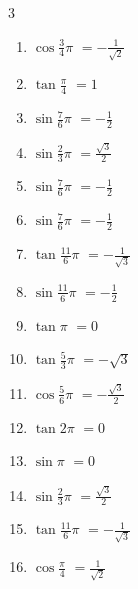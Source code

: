 \begin{multicols}{3}
\begin{enumerate}
  \item $\displaystyle \cos{\frac{3}{4}\pi}$
        $\displaystyle =-\frac{1}{\sqrt{2}}$

  \item $\displaystyle \tan{\frac{\pi}{4}}$
        $\displaystyle =1$

  \item $\displaystyle \sin{\frac{7}{6}\pi}$
        $\displaystyle =-\frac{1}{2}$

  \item $\displaystyle \sin{\frac{2}{3}\pi}$
        $\displaystyle =\frac{\sqrt{3}}{2}$

  \item $\displaystyle \sin{\frac{7}{6}\pi}$
        $\displaystyle =-\frac{1}{2}$

  \item $\displaystyle \sin{\frac{7}{6}\pi}$
        $\displaystyle =-\frac{1}{2}$

  \item $\displaystyle \tan{\frac{11}{6}\pi}$
        $\displaystyle =-\frac{1}{\sqrt{3}}$

\columnbreak %

\resetques

  \item $\displaystyle \sin{\frac{11}{6}\pi}$
        $\displaystyle =-\frac{1}{2}$

  \item $\displaystyle \tan{\pi}$
        $\displaystyle =0$

  \item $\displaystyle \tan{\frac{5}{3}\pi}$
        $\displaystyle =-\sqrt{3}$

  \item $\displaystyle \cos{\frac{5}{6}\pi}$
        $\displaystyle =-\frac{\sqrt{3}}{2}$

  \item $\displaystyle \tan{2\pi}$
        $\displaystyle =0$

  \item $\displaystyle \sin{\pi}$
        $\displaystyle =0$

  \item $\displaystyle \sin{\frac{2}{3}\pi}$
        $\displaystyle =\frac{\sqrt{3}}{2}$

  \item $\displaystyle \tan{\frac{11}{6}\pi}$
        $\displaystyle =-\frac{1}{\sqrt{3}}$

  \item $\displaystyle \cos{\frac{\pi}{4}}$
        $\displaystyle =\frac{1}{\sqrt{2}}$


\end{enumerate}
\end{multicols}

